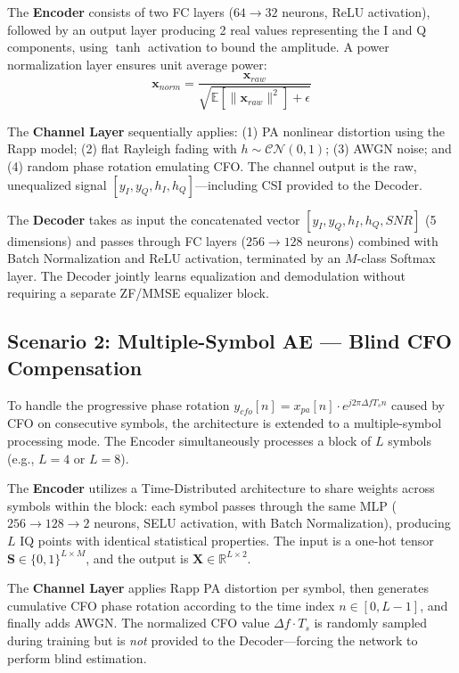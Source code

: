 \documentclass[a4paper,14pt]{extreport}
\begin{document}
The \textbf{Encoder} consists of two FC layers ($64 \to 32$ neurons, ReLU activation), followed by an output layer producing 2 real values representing the I and Q components, using $\tanh$ activation to bound the amplitude. A power normalization layer ensures unit average power:
\begin{equation}
\mathbf{x}_{norm} = \frac{\mathbf{x}_{raw}}{\sqrt{\mathbb{E}[\|\mathbf{x}_{raw}\|^2] + \epsilon}}
\end{equation}

The \textbf{Channel Layer} sequentially applies: (1) PA nonlinear distortion using the Rapp model; (2) flat Rayleigh fading with $h \sim \mathcal{CN}(0,1)$; (3) AWGN noise; and (4) random phase rotation emulating CFO. The channel output is the raw, unequalized signal $[y_I, y_Q, h_I, h_Q]$---including CSI provided to the Decoder.

The \textbf{Decoder} takes as input the concatenated vector $[y_I, y_Q, h_I, h_Q, SNR]$ (5 dimensions) and passes through FC layers ($256 \to 128$ neurons) combined with Batch Normalization and ReLU activation, terminated by an $M$-class Softmax layer. The Decoder jointly learns equalization and demodulation without requiring a separate ZF/MMSE equalizer block.

\subsection{Scenario 2: Multiple-Symbol AE --- Blind CFO Compensation}

To handle the progressive phase rotation $y_{cfo}[n] = x_{pa}[n] \cdot e^{j2\pi\Delta f T_s n}$ caused by CFO on consecutive symbols, the architecture is extended to a multiple-symbol processing mode. The Encoder simultaneously processes a block of $L$ symbols (e.g., $L = 4$ or $L = 8$).

The \textbf{Encoder} utilizes a Time-Distributed architecture to share weights across symbols within the block: each symbol passes through the same MLP ($256 \to 128 \to 2$ neurons, SELU activation, with Batch Normalization), producing $L$ IQ points with identical statistical properties. The input is a one-hot tensor $\mathbf{S} \in \{0,1\}^{L \times M}$, and the output is $\mathbf{X} \in \mathbb{R}^{L \times 2}$.

The \textbf{Channel Layer} applies Rapp PA distortion per symbol, then generates cumulative CFO phase rotation according to the time index $n \in [0, L-1]$, and finally adds AWGN. The normalized CFO value $\Delta f \cdot T_s$ is randomly sampled during training but is \emph{not} provided to the Decoder---forcing the network to perform blind estimation.
\end{document}
